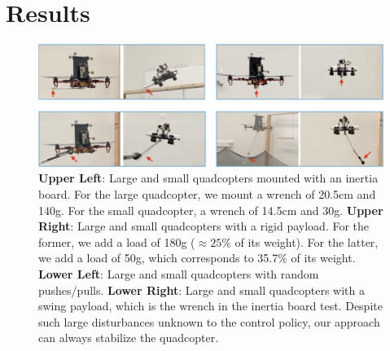 \section{Results}





\begin{figure}[t]
    \centering
    \includegraphics[width=\linewidth]{img/disturbance-include-held-out.png}
    \caption{\textbf{Upper Left}: Large and small quadcopters mounted with an inertia board. For the large quadcopter, we mount a wrench of 20.5cm and 140g. For the small quadcopter, a wrench of 14.5cm and 30g. \textbf{Upper Right}: Large and small quadcopters with a rigid payload. For the former, we add a load of 180g ($\approx 25\%$ of its weight). For the latter, we add a load of 50g, which corresponds to 35.7\% of its weight. \textbf{Lower Left}: Large and small quadcopters with random pushes/pulls. \textbf{Lower Right}: Large and small quadcopters with a swing payload, which is the wrench in the inertia board test. Despite such large disturbances unknown to the control policy, our approach can always stabilize the quadcopter.}
    \label{fig:distur}
\end{figure}

